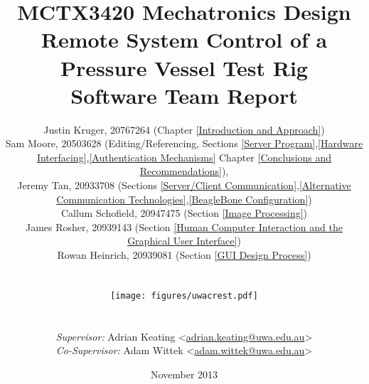 \begin{titlepage}
\title{MCTX3420 Mechatronics Design\\Remote System Control of a Pressure Vessel Test Rig\\Software Team Report}
\author{Justin Kruger, 20767264 (Chapter \ref{Introduction and Approach})\\
		Sam Moore, 20503628 (Editing/Referencing, Sections \ref{Server Program},\ref{Hardware Interfacing},\ref{Authentication Mechanisms} Chapter \ref{Conclusions and Recommendations}), \\
		Jeremy Tan, 20933708 (Sections \ref{Server/Client Communication},\ref{Alternative Communication Technologies},\ref{BeagleBone Configuration})\\
		Callum Schofield, 20947475 (Section \ref{Image Processing})\\
		James Rosher, 20939143 (Section \ref{Human Computer Interaction and the Graphical User Interface}) \\
		Rowan Heinrich, 20939081 (Section \ref{GUI Design Process}) \\ \\ \\
		\texttt{[image: figures/uwacrest.pdf]} \\ \\ \\
		\emph{Supervisor:} Adrian Keating <\href{mailto:adrian.keating@uwa.edu.au}{adrian.keating@uwa.edu.au}> \\
		\emph{Co-Supervisor:} Adam Wittek <\href{mailto:adam.wittek@uwa.edu.au}{adam.wittek@uwa.edu.au}>
}

\date{November 2013}

\maketitle
\centering

\end{titlepage}
